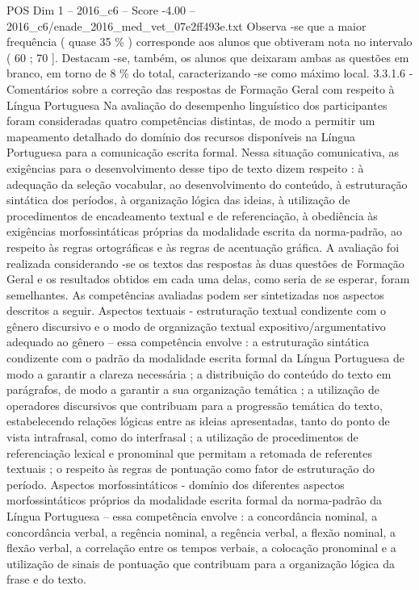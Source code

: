 \begin{textsample}{POS Dim 1 – 2016\_c6 – Score -4.00 – 2016\_c6/enade\_2016\_med\_vet\_07e2ff493e.txt}
Observa -se que a maior frequência ( quase 35 \% ) corresponde aos alunos que obtiveram nota no intervalo ( 60 ; 70 ].
Destacam -se, também, os alunos que deixaram ambas as questões em branco, em torno de 8 \% do total, caracterizando -se como máximo local. 3.3.1.6 - Comentários sobre a correção das respostas de Formação Geral com respeito à Língua Portuguesa Na avaliação do desempenho linguístico dos participantes foram consideradas quatro competências distintas, de modo a permitir um mapeamento detalhado do domínio dos recursos disponíveis na Língua Portuguesa para a comunicação escrita formal.
Nessa situação comunicativa, as exigências para o desenvolvimento desse tipo de texto dizem respeito : à adequação da seleção vocabular, ao desenvolvimento do conteúdo, à estruturação sintática dos períodos, à organização lógica das ideias, à utilização de procedimentos de encadeamento textual e de referenciação, à obediência às exigências morfossintáticas próprias da modalidade escrita da norma-padrão, ao respeito às regras ortográficas e às regras de acentuação gráfica.
A avaliação foi realizada considerando -se os textos das respostas às duas questões de Formação Geral e os resultados obtidos em cada uma delas, como seria de se esperar, foram semelhantes.
As competências avaliadas podem ser sintetizadas nos aspectos descritos a seguir.
Aspectos textuais - estruturação textual condizente com o gênero discursivo e o modo de organização textual expositivo/argumentativo adequado ao gênero – essa competência envolve : a estruturação sintática condizente com o padrão da modalidade escrita formal da Língua Portuguesa de modo a garantir a clareza necessária ; a distribuição do conteúdo do texto em parágrafos, de modo a garantir a sua organização temática ; a utilização de operadores discursivos que contribuam para a progressão temática do texto, estabelecendo relações lógicas entre as ideias apresentadas, tanto do ponto de vista intrafrasal, como do interfrasal ; a utilização de procedimentos de referenciação lexical e pronominal que permitam a retomada de referentes textuais ; o respeito às regras de pontuação como fator de estruturação do período.
Aspectos morfossintáticos - domínio dos diferentes aspectos morfossintáticos próprios da modalidade escrita formal da norma-padrão da Língua Portuguesa – essa competência envolve : a concordância nominal, a concordância verbal, a regência nominal, a regência verbal, a flexão nominal, a flexão verbal, a correlação entre os tempos verbais, a colocação pronominal e a utilização de sinais de pontuação que contribuam para a organização lógica da frase e do texto.

\end{textsample}
